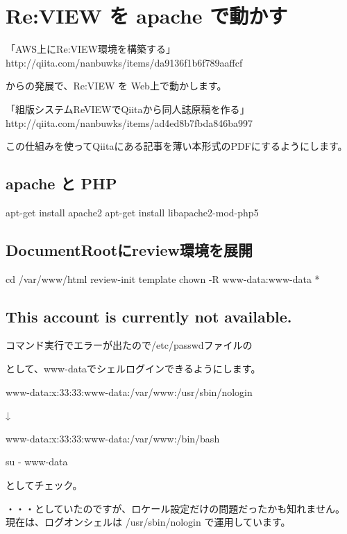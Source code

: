 \chapter{Re:VIEW を apache で動かす}
\label{chap:reviewOnApache}

「AWS上にRe:VIEW環境を構築する」
http://qiita.com/nanbuwks/items/da9136f1b6f789aaffcf

からの発展で、Re:VIEW を Web上で動かします。

「組版システムReVIEWでQiitaから同人誌原稿を作る」
http://qiita.com/nanbuwks/items/ad4ed8b7fbda846ba997

この仕組みを使ってQiitaにある記事を薄い本形式のPDFにするようにします。

\section{apache と PHP}
\label{sec:6-1}

apt{-}get install apache2
apt{-}get install libapache2{-}mod{-}php5

\section{DocumentRootにreview環境を展開}
\label{sec:6-2}

cd /var/www/html
review{-}init template
chown {-}R www{-}data:www{-}data *

\section{This account is currently not available.}
\label{sec:6-3}

コマンド実行でエラーが出たので/etc/passwdファイルの

として、www{-}dataでシェルログインできるようにします。

\begin{reviewemlist}
www{-}data:x:33:33:www{-}data:/var/www:/usr/sbin/nologin
\end{reviewemlist}

↓

\begin{reviewemlist}
www{-}data:x:33:33:www{-}data:/var/www:/bin/bash
\end{reviewemlist}

su {-} www{-}data

としてチェック。

・・・としていたのですが、ロケール設定だけの問題だったかも知れません。
現在は、ログオンシェルは /usr/sbin/nologin で運用しています。

